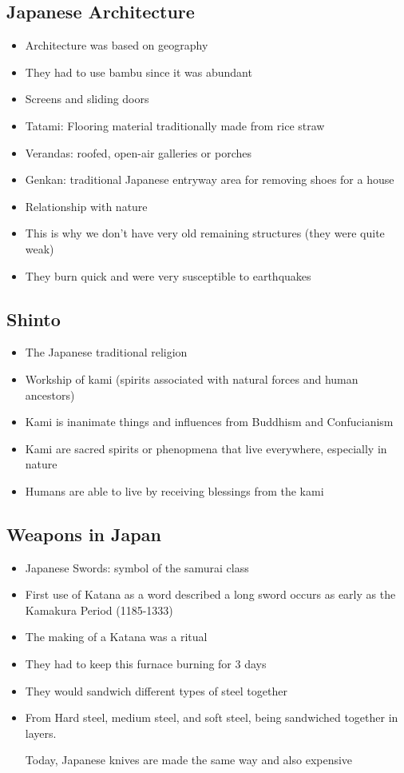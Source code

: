 \documentclass{article}
\begin{document}
\subsection{Japanese Architecture}
\begin{itemize}
  \item Architecture was based on geography
  \item They had to use bambu since it was abundant
  \item Screens and sliding doors
  \item Tatami: Flooring material traditionally made from rice straw
  \item Verandas: roofed, open-air galleries or porches
  \item Genkan: traditional Japanese entryway area for removing shoes for a house
  \item Relationship with nature
  \item This is why we don't have very old remaining structures (they were quite weak)
  \item They burn quick and were very susceptible to earthquakes
\end{itemize}

\subsection{Shinto}
\begin{itemize}
  \item The Japanese traditional religion
  \item Workship of kami (spirits associated with natural forces and human ancestors)
  \item Kami is inanimate things and influences from Buddhism and Confucianism
  \item Kami are sacred spirits or phenopmena that live everywhere, especially in nature
  \item Humans are able to live by receiving blessings from the kami
\end{itemize}

\subsection{Weapons in Japan}
\begin{itemize}
  \item Japanese Swords: symbol of the samurai class
  \item First use of Katana as a word described a long sword occurs as early
    as the Kamakura Period (1185-1333)
  \item The making of a Katana was a ritual
  \item They had to keep this furnace burning for 3 days
  \item They would sandwich different types of steel together
  \item From Hard steel, medium steel, and soft steel, being
    sandwiched together in layers.

    Today, Japanese knives are made the same way and also expensive
\end{itemize}
\end{document}
